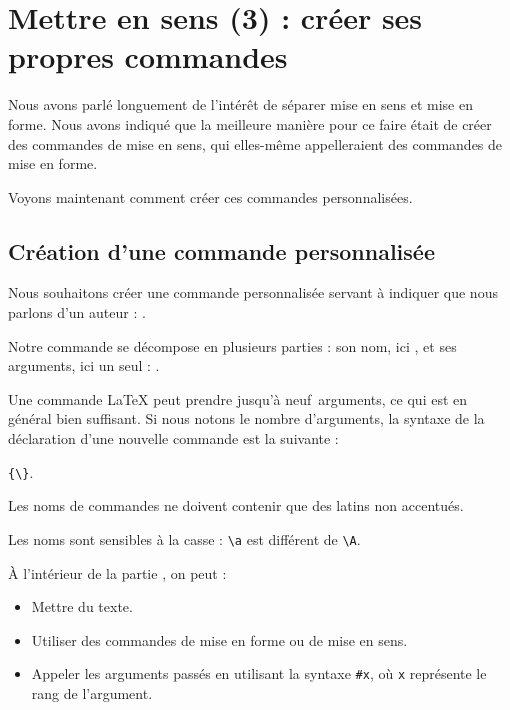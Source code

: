 \chapter{Mettre en sens (3) : créer ses propres commandes}\label{creercommandes}

\begin{prealable}
Nous avons parlé longuement de l'intérêt de séparer mise en sens et mise en forme.
Nous avons indiqué que la meilleure manière pour ce faire était de créer des commandes de mise en sens, qui elles-même appelleraient des commandes de mise en forme.

Voyons maintenant comment créer ces commandes personnalisées.
\end{prealable}

\section{Création d'une commande personnalisée}

Nous souhaitons créer une commande personnalisée servant à indiquer que nous parlons d'un auteur : .

Notre commande se décompose en plusieurs parties : son nom, ici , et ses arguments, ici un seul : .

Une commande LaTeX peut prendre jusqu'à neuf~arguments, ce qui est en général bien suffisant. Si nous notons  le nombre d'arguments, la syntaxe de la déclaration d'une nouvelle commande est la suivante :

\verb|{\|\verb|}|.

\begin{attention}
    Les noms de commandes ne doivent contenir que des latins non accentués. 
    
    Les noms sont sensibles à la casse : \verb|\a| est différent de \verb|\A|.
\end{attention}
À l'intérieur de la partie , on peut  :
\begin{itemize}
    \item Mettre du texte.
    \item Utiliser des commandes de mise en forme ou de mise en sens.
    \item Appeler les arguments passés en utilisant la syntaxe \verb|#x|, où \verb|x| représente le rang de l'argument.
\end{itemize}


